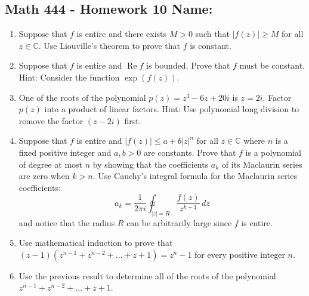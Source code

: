 \documentclass[11pt]{article}
\newcommand{\C}{\mathbb{C}}
\newcommand{\re}{\operatorname{Re}}
\begin{document}
\pagestyle{empty}
\subsection*{Math 444 - Homework 10 \hfill Name: \underline{\hspace*{2in}}}
\noindent

\begin{enumerate}
\item Suppose that $f$ is entire and there exists $M > 0$ such that $|f(z)| \ge M$ for all $z \in \C$.  Use Liouville's theorem to prove that $f$ is constant.  
\vfill

\item Suppose that $f$ is entire and $\re f$ is bounded. Prove that $f$ must be constant.  Hint: Consider the function $\exp(f(z))$.  
\vfill


\item One of the roots of the polynomial $p(z) = z^3 - 6z + 20i$ is $z = 2i$.  Factor $p(z)$ into a product of linear factors. Hint: Use polynomial long division to remove the factor $(z-2i)$ first.
\vfill

\newpage


\item Suppose that $f$ is entire and $|f(z)| \le a+b|z|^n$ for all $z \in \C$ where $n$ is a fixed positive integer and $a,b > 0$ are constants.  Prove that $f$ is a polynomial of degree at most $n$ by showing that the coefficients $a_k$ of its Maclaurin series are zero when $k > n$.  Use Cauchy's integral formula for the Maclaurin series coefficients:
$$a_k = \frac{1}{2\pi i} \oint_{|z|=R} \frac{f(z)}{z^{k+1}} \, dz$$
and notice that the radius $R$ can be arbitrarily large since $f$ is entire.
\vfill

\item Use mathematical induction to prove that $(z-1)(z^{n-1} + z^{n-2} + \ldots + z + 1) = z^n - 1$ for every positive integer $n$.
\vfill

\item Use the previous result to determine all of the roots of the polynomial $z^{n-1} + z^{n-2} + \ldots + z + 1$.  
\vfill



\end{enumerate}
\end{document}
